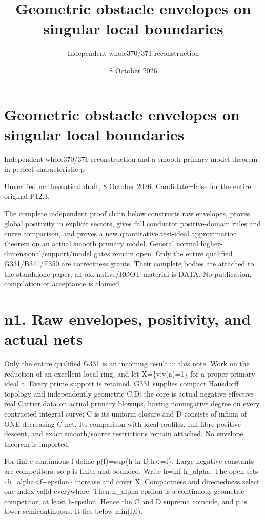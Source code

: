 \documentclass[11pt]{article}
\title{Geometric obstacle envelopes on singular local boundaries}
\author{Independent whole370/371 reconstruction}
\date{8 October 2026}
\begin{document}
\maketitle
\tableofcontents
\section{Geometric obstacle envelopes on singular local boundaries}

Independent whole370/371 reconstruction and a smooth-primary-model theorem in perfect characteristic p

Unverified mathematical draft, 8 October 2026. Candidate=false for the entire original P12.3.

The complete independent proof chain below constructs raw envelopes, proves global positivity in explicit sectors, gives full conductor positive-domain rules and curve comparison, and proves a new quantitative test-ideal approximation theorem on an actual smooth primary model. General normal higher-dimensional/support/model gates remain open. Only the entire qualified G331/B341/E350 are correctness grants. Their complete bodies are attached to the standalone paper; all old native/ROOT material is DATA. No publication, compilation or acceptance is claimed.

\section{n1. Raw envelopes, positivity, and actual nets}

Only the entire qualified G331 is an incoming result in this note. Work on the reduction of an excellent local ring, and let X=\{v:v(a)=1\} for a proper primary ideal a. Every prime support is retained. G331 supplies compact Hausdorff topology and independently geometric C,D: the core is actual negative effective real Cartier data on actual primary blowups, having nonnegative degree on every contracted integral curve; C is its uniform closure and D consists of infima of ONE decreasing C-net. Its comparison with ideal profiles, full-fibre positive descent, and exact smooth/source restrictions remain attached. No envelope theorem is imported.

For finite continuous f define p(f)=sup\{h in D:h<=f\}. Large negative constants are competitors, so p is finite and bounded. Write h=inf h\_alpha. The open sets \{h\_alpha<f+epsilon\} increase and cover X. Compactness and directedness select one index valid everywhere. Then h\_alpha-epsilon is a continuous geometric competitor, at least h-epsilon. Hence the C and D suprema coincide, and p is lower semicontinuous. It lies below min(f,0).
\end{document}
